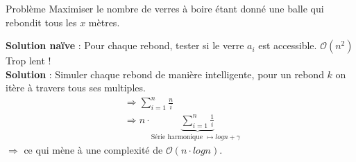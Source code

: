 \begin{frame}
    \frametitle{\problemtitle}
        \begin{block}
            {Problème} Maximiser le nombre de verres à boire étant donné une balle qui rebondit tous les $x$ mètres.
        \end{block}
        \pause
        \textbf{Solution naïve} : Pour chaque rebond, tester si le verre $a_i$ est accessible. $\mathcal O(n^2)$ Trop lent !\\
        \pause
        \textbf{Solution} : Simuler chaque rebond de manière intelligente, pour un rebond $k$ on itère à travers tous ses multiples. \\
        \pause
        \begin{align}
            &\Rightarrow \sum_{i=1}^{n} \frac{n}{i}\\
            &\Rightarrow n \cdot \underbrace{\sum_{i=1}^{n} \frac{1}{i}}_{\text{Série harmonique $\mapsto log n + \gamma$ }}
        \end{align}
        $\Rightarrow$ ce qui mène à une complexité de $\mathcal O(n \cdot log n)$.
        \pause\solvestats
\end{frame}

